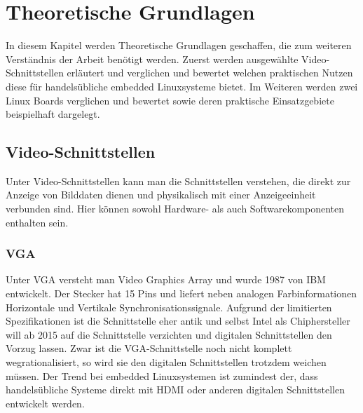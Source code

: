 \chapter{Theoretische Grundlagen}
\label{cha:Grundlagen}
In diesem Kapitel werden Theoretische Grundlagen geschaffen, die zum weiteren Verständnis der Arbeit benötigt werden. Zuerst werden ausgewählte Video-Schnittstellen erläutert und verglichen und bewertet welchen praktischen Nutzen diese für handelsübliche embedded Linuxsysteme bietet. Im Weiteren werden zwei Linux Boards verglichen und bewertet sowie deren praktische Einsatzgebiete beispielhaft dargelegt.

\section{Video-Schnittstellen}
Unter Video-Schnittstellen kann man die Schnittstellen verstehen, die direkt zur Anzeige von Bilddaten dienen und physikalisch mit einer Anzeigeeinheit verbunden sind. Hier können sowohl Hardware- als auch Softwarekomponenten enthalten sein.
\subsection{VGA}
Unter VGA versteht man Video Graphics Array und wurde 1987 von IBM entwickelt. Der Stecker hat 15 Pins und liefert neben analogen Farbinformationen Horizontale und Vertikale Synchronisationssignale. Aufgrund der limitierten Spezifikationen ist die Schnittstelle eher antik und selbst Intel als Chiphersteller will ab 2015 auf die Schnittstelle verzichten \cite{Intel2010} und digitalen Schnittstellen den Vorzug lassen. Zwar ist die VGA-Schnittstelle noch nicht komplett wegrationalisiert, so wird sie den digitalen Schnittstellen trotzdem weichen müssen. Der Trend bei embedded Linuxsystemen ist zumindest der, dass handelsübliche Systeme direkt mit HDMI oder anderen digitalen Schnittstellen entwickelt werden.

